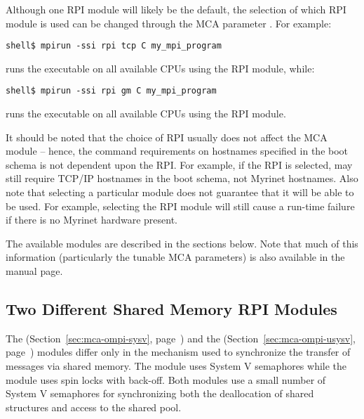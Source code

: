 Although one RPI module will likely be the default, the selection of
which RPI module is used can be changed through the MCA parameter
.  For example:

\lstset{style=lam-cmdline}
\begin{lstlisting}
shell$ mpirun -ssi rpi tcp C my_mpi_program
\end{lstlisting}

\noindent runs the  executable on all
available CPUs using the  RPI module, while:

\lstset{style=lam-cmdline}
\begin{lstlisting}
shell$ mpirun -ssi rpi gm C my_mpi_program
\end{lstlisting}

\noindent runs the  executable on all
available CPUs using the  RPI module.

It should be noted that the choice of RPI usually does not affect the
 MCA module -- hence, the  command
requirements on hostnames specified in the boot schema is not
dependent upon the RPI.  For example, if the  RPI is selected,
 may still require TCP/IP hostnames in the boot schema,
not Myrinet hostnames.  Also note that selecting a particular module
does not guarantee that it will be able to be used.  For example,
selecting the  RPI module will still cause a run-time failure
if there is no Myrinet hardware present.

The available modules are described in the sections below.  Note that
much of this information (particularly the tunable MCA parameters) is
also available in the  manual page.



\subsection{Two Different Shared Memory RPI Modules}
\label{sec:mca-ompi-shmem}

The  (Section~\ref{sec:mca-ompi-sysv},
page~\pageref{sec:mca-ompi-sysv}) and the 
(Section~\ref{sec:mca-ompi-usysv}, page~\pageref{sec:mca-ompi-usysv})
modules differ only in the mechanism used to synchronize the transfer
of messages via shared memory.
%
The  module uses System V semaphores while the 
module uses spin locks with back-off.
%
Both modules use a small number of System V semaphores for
synchronizing both the deallocation of shared structures and access to
the shared pool.

